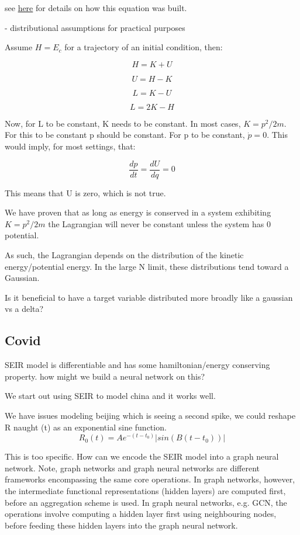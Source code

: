 \documentclass{article}
\begin{document}
see \href{http://www.physics.hmc.edu/~saeta/courses/p111/uploads/Y2013/lec131023-DSHO.pdf}{here} for details on how this equation was built. 

- distributional assumptions for practical purposes

Assume $ H = E_c $ for a trajectory of an initial condition, then:

$$ H = K + U $$

$$U = H - K $$

$$ L = K - U $$

$$ L = 2K -H $$

Now, for L to be constant, K needs to be constant. In most cases, $ K = p^2/2m $. For this to be constant p should be constant. For p to be constant, $\dot{p} = 0$. This would imply, for most settings, that:

$$ \frac{dp}{dt} = \frac{dU}{dq} = 0 $$

This means that U is zero, which is not true.

We have proven that as long as energy is conserved in a system exhibiting $K = p^2/2m$ the Lagrangian will never be constant unless the system has 0 potential. 

As such, the Lagrangian depends on the distribution of the kinetic energy/potential energy. In the large N limit, these distributions tend toward a Gaussian.

Is it beneficial to have a target variable distributed more broadly like a gaussian vs a delta?


\subsection{Covid}


SEIR model is differentiable and has some hamiltonian/energy conserving property. how might we build a neural network on this?

We start out using SEIR to model china and it works well.

We have issues modeling beijing which is seeing a second spike, we could reshape R naught (t) as an exponential sine function.
$$ R_0(t) = Ae^{-(t-t_0)}|sin(B(t-t_0))| $$

This is too specific. How can we encode the SEIR model into a graph neural network. Note, graph networks and graph neural networks are different frameworks encompassing the same core operations. In graph networks, however, the intermediate functional representations (hidden layers) are computed first, before an aggregation scheme is used. In graph neural networks, e.g. GCN, the operations involve computing a hidden layer first using neighbouring nodes, before feeding these hidden layers into the graph neural network.
\end{document}
